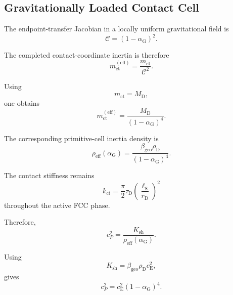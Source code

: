 \subsection{Gravitationally Loaded Contact Cell}

The endpoint-transfer Jacobian in a locally uniform gravitational field is
\begin{equation}
    \mathcal{C} = \left( 1-\alpha_{\mathrm{G}} \right)^2.
\end{equation}

The completed contact-coordinate inertia is therefore
\begin{equation}
    m_{\mathrm{ct}}^{(\mathrm{eff})} = \frac{m_{\mathrm{ct}}}{\mathcal{C}^2}.
\end{equation}

Using
\begin{equation}
    m_{\mathrm{ct}} = M_{\mathrm{D}},
\end{equation}
one obtains
\begin{equation}
    \boxed{ m_{\mathrm{ct}}^{(\mathrm{eff})} = \frac{M_{\mathrm{D}}}{ \left( 1-\alpha_{\mathrm{G}} \right)^4 } }.
\end{equation}

The corresponding primitive-cell inertia density is
\begin{equation}
    \boxed{ \rho_{\mathrm{eff}} \left( \alpha_{\mathrm{G}} \right) = \frac{ \beta_{\mathrm{geo}}\rho_{\mathrm{D}} }{ \left( 1-\alpha_{\mathrm{G}} \right)^4 } }.
\end{equation}

The contact stiffness remains
\begin{equation}
    k_{\mathrm{ct}} = \frac{\pi}{2} \tau_{\mathrm{D}} \left( \frac{\ell_{\mathrm{S}}}{r_{\mathrm{D}}} \right)^2
\end{equation}
throughout the active FCC phase.

Therefore,
\begin{equation}
    c_P^2 = \frac{K_{\mathrm{sh}}}{\rho_{\mathrm{eff}}(\alpha_{\mathrm{G}})}.
\end{equation}

Using
\begin{equation}
    K_{\mathrm{sh}} = \beta_{\mathrm{geo}}\rho_{\mathrm{D}}c_{\mathrm{E}}^2,
\end{equation}
gives
\begin{equation}
    c_P^2 = c_{\mathrm{E}}^2 \left( 1-\alpha_{\mathrm{G}} \right)^4.
\end{equation}

